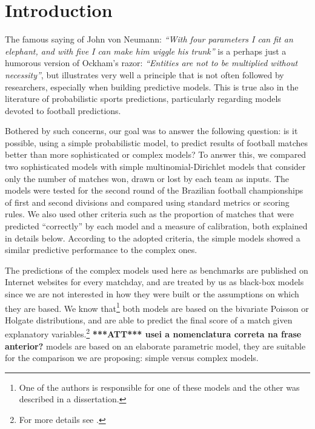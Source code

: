\documentclass[journal,article,accept,moreauthors,pdftex,12pt,a4paper]{mdpi}
\newcommand{\red}[1]{\textbf{\color{red} ***ATT*** #1}}
\begin{document}

\section{Introduction}

The famous saying of John von Neumann: {\it ``With four parameters I can fit an elephant, and with five I can make him wiggle his trunk''} is a perhaps just a humorous version of Ockham's razor: 
{\it``Entities are not to be multiplied without necessity''}, but illustrates very well a principle that is not often followed by researchers, especially when building predictive models. 
This is true also in the literature of probabilistic sports predictions, particularly regarding models devoted to football predictions.

Bothered by such concerns, our goal was to answer the following question: is it possible, using a simple probabilistic model, to predict results of football matches better than more sophisticated or complex models?
To answer this, we compared two sophisticated models  with simple multinomial-Dirichlet models that consider only the number of matches won, drawn or lost by each team as inputs.
The models were tested for the second round of the Brazilian football championships of first and second divisions and compared using standard metrics or scoring rules.
We also used other criteria such as the proportion of matches that were predicted ``correctly'' by each model and a measure of calibration, both explained in details below.
According to the adopted criteria, the simple models showed a similar predictive performance to the complex ones.

The predictions of the complex models used here as benchmarks are published on Internet websites for every matchday, and are treated by us as black-box models since we are not interested in how they were built or the assumptions on which they are based.
We know that\footnote{One of the authors is responsible for one of these models and the other was described in a dissertation.} both models are based on the bivariate Poisson or Holgate distributions, and are able to predict the final score of a match given explanatory variables.\footnote{For more details see \cite{arruda2000}.}
  \red{usei a nomenclatura correta na frase anterior?}
 models are based on an elaborate parametric model, they are suitable for the comparison we are proposing: simple versus complex models. 
\end{document}
